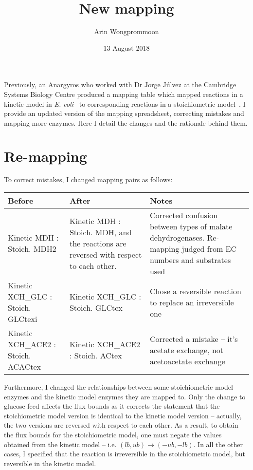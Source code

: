 \documentclass[parskip=full]{scrartcl}
\author{Arin Wongprommoon}
\title{New mapping}
\date{13 August 2018}
\begin{document}
\maketitle


 Previously, an Anargyros who worked with Dr Jorge J\'ulvez at the Cambridge Systems Biology Centre produced a mapping table which mapped reactions in a kinetic model in \emph{E. coli}~\cite{millard_metabolic_2017} to corresponding reactions in a stoichiometric model~\cite{orth_comprehensive_2011}. I provide an updated version of the mapping spreadsheet, correcting mistakes and mapping more enzymes. Here I detail the changes and the rationale behind them.

\section{Re-mapping}
\label{sec:remapping}

To correct mistakes, I changed mapping pairs as follows:

\begin{tabularx}{\linewidth}{|L|L|L|}
  \hline
  Before & After & Notes\\
  \hline
  Kinetic MDH : Stoich. MDH2 & Kinetic MDH : Stoich. MDH, and the reactions are reversed with respect to each other. & Corrected confusion between types of malate dehydrogenases. Re-mapping judged from EC numbers and substrates used\\
  \hline
  Kinetic XCH\_GLC : Stoich. GLCtexi & Kinetic XCH\_GLC : Stoich. GLCtex & Chose a reversible reaction to replace an irreversible one\\
  \hline
  Kinetic XCH\_ACE2 : Stoich. ACACtex & Kinetic XCH\_ACE2 : Stoich. ACtex & Corrected a mistake -- it's acetate exchange, not acetoacetate exchange\\
  \hline
\end{tabularx}

Furthermore, I changed the relationships between some stoichiometric model enzymes and the kinetic model enzymes they are mapped to. Only the change to glucose feed affects the flux bounds as it corrects the statement that the stoichiometric model version is identical to the kinetic model version -- actually, the two versions are reversed with respect to each other. As a result, to obtain the flux bounds for the stoichiometric model, one must negate the values obtained from the kinetic model -- i.e. $(lb, ub) \rightarrow (-ub, -lb)$. In all the other cases, I specified that the reaction is irreversible in the stoichiometric model, but reversible in the kinetic model.
\end{document}
